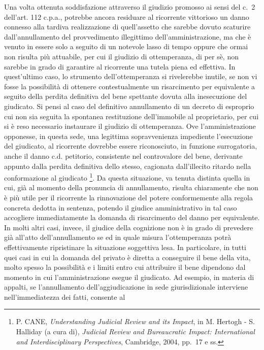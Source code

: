 \documentclass[12pt,it,a4paper,]{report}
\begin{document}
Una volta ottenuta soddisfazione attraverso il giudizio promosso ai
sensi del c.~2 dell'art. 112 c.p.a., potrebbe ancora residuare al
ricorrente vittorioso un danno connesso alla tardiva realizzazione di
quell'assetto che sarebbe dovuto scaturire dall'annullamento del
provvedimento illegittimo dell'amministrazione, ma che è venuto in
essere solo a seguito di un notevole lasso di tempo oppure che ormai non
risulta più attuabile, per cui il giudizio di ottemperanza, di per sè,
non sarebbe in grado di garantire al ricorrente una tutela piena ed
effettiva. In quest'ultimo caso, lo strumento dell'ottemperanza si
rivelerebbe inutile, se non vi fosse la possibilità di ottenere
contestualmente un risarcimento per equivalente a seguito della perdita
definitiva del bene spettante dovuta alla inesecuzione del giudicato. Si
pensi al caso del definitivo annullamento di un decreto di esproprio cui
non sia seguita la spontanea restituzione dell'immobile al proprietario,
per cui si è reso necessario instaurare il giudizio di ottemperanza. Ove
l'amministrazione opponesse, in questa sede, una legittima
sopravvenienza impediente l'esecuzione del giudicato, al ricorrente
dovrebbe essere riconosciuto, in funzione surrogatoria, anche il danno
c.d. petitorio, consistente nel controvalore del bene, derivante appunto
dalla perdita definitiva dello stesso, cagionata dall'illecito ritardo
nella conformazione al giudicato \footnote{P. CANE, \emph{Understanding
  Judicial Review and its Impact}, in M. Hertogh - S. Halliday (a cura
  di), \emph{Judicial Review and Bureaucratic Impact: International and
  Interdisciplinary Perspectives}, Cambridge, 2004, pp.~17 e ss.}. Da
questa situazione, va tenuta distinta quella in cui, già al momento
della pronuncia di annullamento, risulta chiaramente che non è più utile
per il ricorrente la rinnovazione del potere conformemente alla regola
concreta dedotta in sentenza, potendo il giudice amministrativo in tal
caso accogliere immediatamente la domanda di risarcimento del danno per
equivalente. In molti altri casi, invece, il giudice della cognizione
non è in grado di prevedere già all'atto dell'annullamento se ed in
quale misura l'ottemperanza potrà effettivamente ripristinare la
situazione soggettiva lesa. In particolare, in tutti quei casi in cui la
domanda del privato è diretta a conseguire il bene della vita, molto
spesso la possibilità e i limiti entro cui attribuire il bene dipendono
dal momento in cui l'amministrazione esegue il giudicato. Ad esempio, in
materia di appalti, se l'annullamento dell'aggiudicazione in sede
giurisdizionale interviene nell'immediatezza dei fatti, consente al
\end{document}
